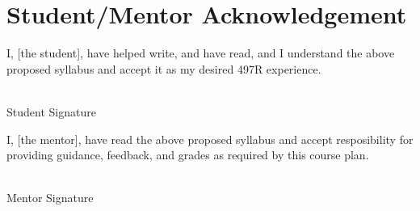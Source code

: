 \documentclass[12pt]{article}
\begin{document}
\section{Student/Mentor Acknowledgement}
\label{sec:acknowledgement}

I, [the student], have helped write, and have read, and I understand the above proposed syllabus and accept it as my desired 497R experience.

\vspace{2em}

\noindent \makebox[2.5in]{\hrulefill} \hspace {1.0in}\makebox[2.5in]{\hrulefill} \\
Student Signature  \\

\bigskip

I, [the mentor], have read the above proposed syllabus and accept resposibility for providing guidance, feedback, and grades as required by this course plan.

\vspace{2em}

\noindent \makebox[2.5in]{\hrulefill} \hspace {1.0in}\makebox[2.5in]{\hrulefill} \\
Mentor Signature  \\
\end{document}
